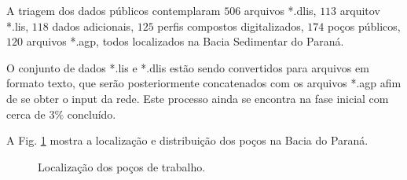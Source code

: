 A triagem dos dados públicos contemplaram  $506$ arquivos *.dlis, $113$ arquitov *.lis, $118$ dados adicionais, $125$ perfis compostos digitalizados, $174$ poços públicos, $120$ arquivos *.agp, todos localizados na Bacia Sedimentar do Paraná. 

O conjunto de dados *.lis e *.dlis estão sendo convertidos para arquivos em formato texto, que serão posteriormente concatenados  com os arquivos *.agp afim de se obter o input da rede. Este processo ainda se encontra na fase inicial com cerca de $3\%$ concluído.

A Fig. \ref{real} mostra a localização e distribuição dos poços na Bacia do Paraná.

\begin{figure}[H]
	\centering
	\setlength{\fboxsep}{8pt}
	\setlength{\fboxrule}{0.1pt}
	\caption{Localização dos poços de trabalho.}
	\label{real}
\end{figure}


